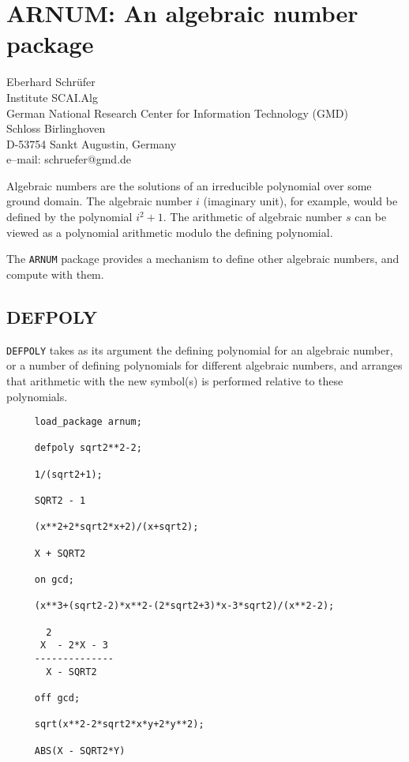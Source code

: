 \chapter{ARNUM: An algebraic number package}
\label{ARNUM}

{\footnotesize
\begin{center}
Eberhard Schr\"{u}fer \\
Institute SCAI.Alg   \\
German National Research Center for Information Technology (GMD) \\
Schloss Birlinghoven \\
D-53754 Sankt Augustin, Germany       \\[0.05in]
e--mail: schruefer@gmd.de
\end{center}
}

Algebraic numbers are the solutions of an irreducible polynomial over
some ground domain.  The algebraic number $i$ (imaginary
unit), for example, would be defined by the
polynomial $i^2 + 1$.  The arithmetic of algebraic number $s$ can be
viewed as a polynomial arithmetic modulo the defining polynomial.

The {\tt ARNUM}  package provides a mechanism to
define other algebraic numbers, and compute with them.

\section{DEFPOLY}

{\tt DEFPOLY} takes as its argument the defining polynomial for an
algebraic number, or a number of defining polynomials for different
algebraic numbers, and arranges that arithmetic with the new symbol(s) is
performed relative to these polynomials.

\begin{verbatim}
     load_package arnum;

     defpoly sqrt2**2-2;

     1/(sqrt2+1);

     SQRT2 - 1

     (x**2+2*sqrt2*x+2)/(x+sqrt2);

     X + SQRT2

     on gcd;

     (x**3+(sqrt2-2)*x**2-(2*sqrt2+3)*x-3*sqrt2)/(x**2-2);

       2
      X  - 2*X - 3
     --------------
       X - SQRT2

     off gcd;

     sqrt(x**2-2*sqrt2*x*y+2*y**2);

     ABS(X - SQRT2*Y)
\end{verbatim}

